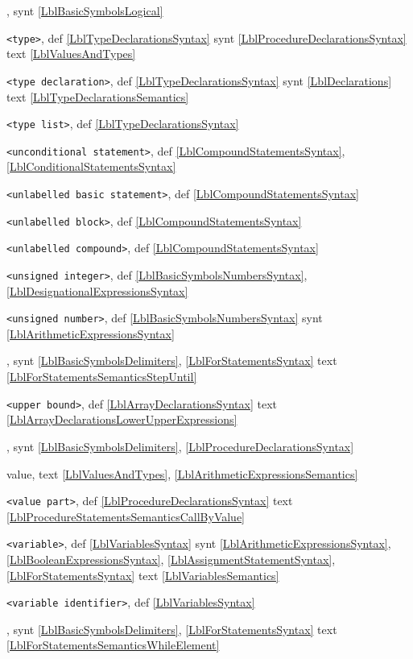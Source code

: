 \documentclass[a4paper,11pt]{article}
\begin{document}
,
synt
\ref{LblBasicSymbolsLogical}\*

\texttt{<type>},
def
\ref{LblTypeDeclarationsSyntax}
synt
\ref{LblProcedureDeclarationsSyntax}
text
\ref{LblValuesAndTypes}\*

\texttt{<type declaration>},
def
\ref{LblTypeDeclarationsSyntax}
synt
\ref{LblDeclarations}
text
\ref{LblTypeDeclarationsSemantics}\*

\texttt{<type list>},
def
\ref{LblTypeDeclarationsSyntax}\*

\texttt{<unconditional statement>},
def
\ref{LblCompoundStatementsSyntax},
\ref{LblConditionalStatementsSyntax}\*

\texttt{<unlabelled basic statement>},
def
\ref{LblCompoundStatementsSyntax}\*

\texttt{<unlabelled block>},
def
\ref{LblCompoundStatementsSyntax}\*

\texttt{<unlabelled compound>},
def
\ref{LblCompoundStatementsSyntax}\*

\texttt{<unsigned integer>},
def
\ref{LblBasicSymbolsNumbersSyntax},
\ref{LblDesignationalExpressionsSyntax}\*

\texttt{<unsigned number>},
def
\ref{LblBasicSymbolsNumbersSyntax}
synt
\ref{LblArithmeticExpressionsSyntax}\*

,
synt
\ref{LblBasicSymbolsDelimiters},
\ref{LblForStatementsSyntax}
text
\ref{LblForStatementsSemanticsStepUntil}\*

\texttt{<upper bound>},
def
\ref{LblArrayDeclarationsSyntax}
text
\ref{LblArrayDeclarationsLowerUpperExpressions}\*

,
synt
\ref{LblBasicSymbolsDelimiters},
\ref{LblProcedureDeclarationsSyntax}\*

value,
text
\ref{LblValuesAndTypes},
\ref{LblArithmeticExpressionsSemantics}\*

\texttt{<value part>},
def
\ref{LblProcedureDeclarationsSyntax}
text
\ref{LblProcedureStatementsSemanticsCallByValue}\*

\texttt{<variable>},
def
\ref{LblVariablesSyntax}
synt
\ref{LblArithmeticExpressionsSyntax},
\ref{LblBooleanExpressionsSyntax},
\ref{LblAssignmentStatementSyntax},
\ref{LblForStatementsSyntax}
text
\ref{LblVariablesSemantics}\*

\texttt{<variable identifier>},
def
\ref{LblVariablesSyntax}\*

,
synt
\ref{LblBasicSymbolsDelimiters},
\ref{LblForStatementsSyntax}
text
\ref{LblForStatementsSemanticsWhileElement}
\end{document}
